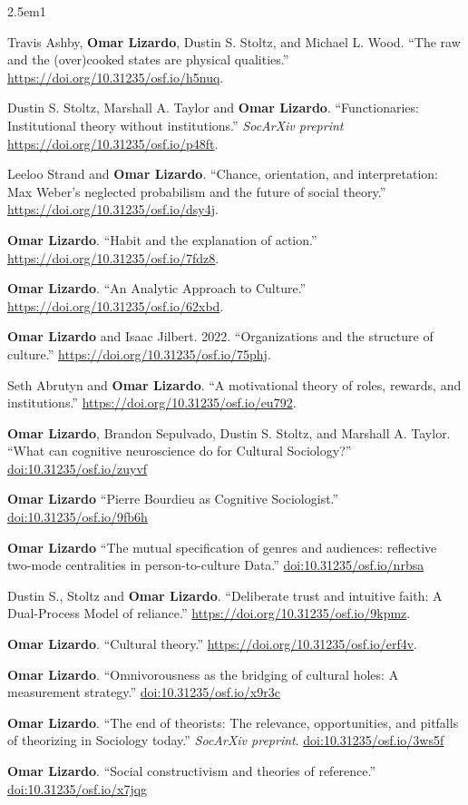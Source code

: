 \documentclass[
]{article}
\newenvironment{cventry}{\begin{hangparas}{2.5em}{1}}{\end{hangparas}}
\begin{document}
\begin{cventry}

Travis Ashby, \textbf{Omar Lizardo}, Dustin S. Stoltz, and Michael L.
Wood. ``The raw and the (over)cooked states are physical qualities.''
\url{https://doi.org/10.31235/osf.io/h5nuq}.

Dustin S. Stoltz, Marshall A. Taylor and \textbf{Omar Lizardo}.
``Functionaries: Institutional theory without institutions.''
\emph{SocArXiv preprint} \url{https://doi.org/10.31235/osf.io/p48ft}.

Leeloo Strand and \textbf{Omar Lizardo}. ``Chance, orientation, and
interpretation: Max Weber's neglected probabilism and the future of
social theory.'' \url{https://doi.org/10.31235/osf.io/dsy4j}.

\textbf{Omar Lizardo}. ``Habit and the explanation of action.''
\url{https://doi.org/10.31235/osf.io/7fdz8}.

\textbf{Omar Lizardo}. ``An Analytic Approach to Culture.''
\url{https://doi.org/10.31235/osf.io/62xbd}.

\textbf{Omar Lizardo} and Isaac Jilbert. 2022. ``Organizations and the
structure of culture.'' \url{https://doi.org/10.31235/osf.io/75phj}.

Seth Abrutyn and \textbf{Omar Lizardo}. ``A motivational theory of
roles, rewards, and institutions.''
\url{https://doi.org/10.31235/osf.io/eu792}.

\textbf{Omar Lizardo}, Brandon Sepulvado, Dustin S. Stoltz, and Marshall
A. Taylor. ``What can cognitive neuroscience do for Cultural
Sociology?''
\href{https://doi.org/10.31235/osf.io/zuyvf}{doi:10.31235/osf.io/zuyvf}

\textbf{Omar Lizardo} ``Pierre Bourdieu as Cognitive Sociologist.''
\href{https://doi.org/10.31235/osf.io/9fb6h}{doi:10.31235/osf.io/9fb6h}

\textbf{Omar Lizardo} ``The mutual specification of genres and
audiences: reflective two-mode centralities in person-to-culture Data.''
\href{https://doi.org/10.31235/osf.io/nrbsa}{doi:10.31235/osf.io/nrbsa}

Dustin S., Stoltz and \textbf{Omar Lizardo}. ``Deliberate trust and
intuitive faith: A Dual-Process Model of reliance.''
\url{https://doi.org/10.31235/osf.io/9kpmz}.

\textbf{Omar Lizardo}. ``Cultural theory.''
\url{https://doi.org/10.31235/osf.io/erf4v}.

\textbf{Omar Lizardo}. ``Omnivorousness as the bridging of cultural
holes: A measurement strategy.''
\href{https://doi.org/10.31235/osf.io/x9r3c}{doi:10.31235/osf.io/x9r3c}

\textbf{Omar Lizardo}. ``The end of theorists: The relevance,
opportunities, and pitfalls of theorizing in Sociology today.''
\emph{SocArXiv preprint}.
\href{https://doi.org/10.31235/osf.io/3ws5f}{doi:10.31235/osf.io/3ws5f}

\textbf{Omar Lizardo}. ``Social constructivism and theories of
reference.''
\href{https://doi.org/10.31235/osf.io/x7jqg}{doi:10.31235/osf.io/x7jqg}

\end{cventry}
\end{document}
